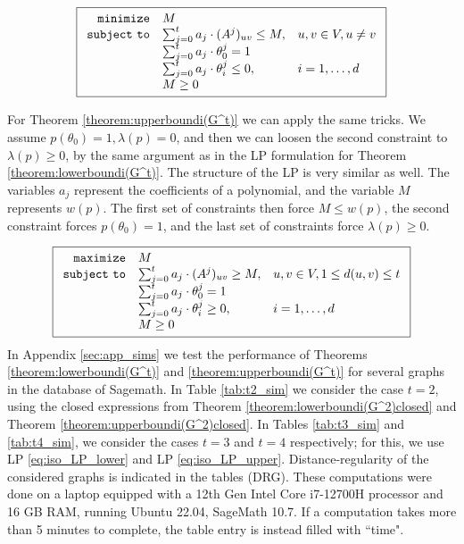 \documentclass[a4paper,11pt]{article}
\theoremstyle{definition}
\begin{document}
\begin{equation}
\label{eq:iso_LP_lower}
\boxed{
\begin{array}{rll}
{\tt minimize} & M \\
{\tt subject\ to} & \sum_{j = 0}^t a_j \cdot (A^j)_{uv} \leq M,&  u,v \in V, u \neq v\\
& \sum_{j = 0}^t a_j \cdot \theta_0^j = 1 \\
 & \sum_{j = 0}^t a_j \cdot \theta_i^j \leq 0, &  i = 1,\dots,d\\
 & M \geq 0
\end{array}}
\end{equation}

For Theorem \ref{theorem:upperboundi(G^t)} we can apply the same tricks. We assume $p(\theta_0)= 1, \lambda(p) = 0$, and then we can loosen the second constraint to $\lambda(p) \geq 0$, by the same argument as in the LP formulation for Theorem \ref{theorem:lowerboundi(G^t)}. The structure of the LP is very similar as well. The variables $a_j$ represent the coefficients of a polynomial, and the variable $M$ represents $w(p)$. The first set of constraints then force $M \leq w(p)$, the second constraint forces $p(\theta_0) =1$, and the last set of constraints force $\lambda(p) \geq 0$. 


\begin{equation}
\label{eq:iso_LP_upper}
\boxed{
\begin{array}{rll}
{\tt maximize} & M \\
{\tt subject\ to} & \sum_{j = 0}^t a_j\cdot (A^j)_{uv} \geq M,&  u,v \in V, 1\leq d(u,v)\leq t\\
& \sum_{j = 0}^t a_j\cdot \theta_0^j = 1\\
& \sum_{j = 0}^t a_j\cdot \theta_i^j \geq 0, &  i = 1,\dots,d\\
& M \geq 0
\end{array}}
\end{equation}
    In Appendix \ref{sec:app_sims} we test the performance of Theorems \ref{theorem:lowerboundi(G^t)} and \ref{theorem:upperboundi(G^t)} for several graphs in the database of Sagemath. 
    In Table \ref{tab:t2_sim} we consider the case $t=2$, using the closed expressions from Theorem \ref{theorem:lowerboundi(G^2)closed} and Theorem \ref{theorem:upperboundi(G^2)closed}. In Tables \ref{tab:t3_sim} and \ref{tab:t4_sim}, we consider the cases $t=3$ and $t=4$ respectively; for this, we use LP \eqref{eq:iso_LP_lower} and LP \eqref{eq:iso_LP_upper}.
    Distance-regularity of the considered graphs  is indicated in the tables (DRG). These computations were done on a laptop equipped with a 12th Gen Intel Core i7-12700H processor and 16 GB RAM, running Ubuntu 22.04, SageMath 10.7. If a computation takes more than 5 minutes to complete, the table entry is instead filled with ``time".
\end{document}
